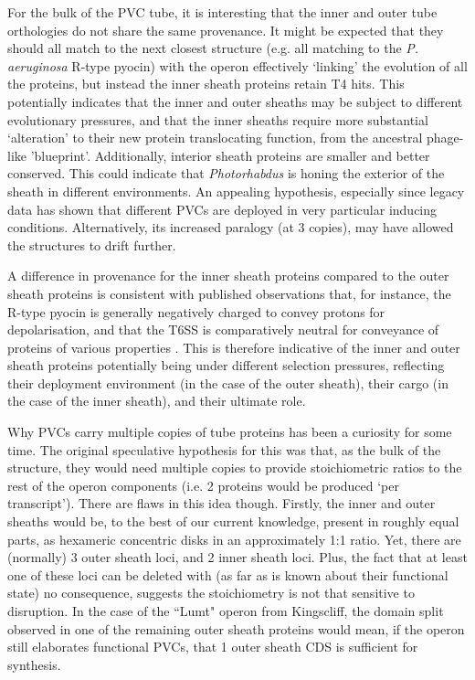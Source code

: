 For the bulk of the PVC tube, it is interesting that the inner and outer tube orthologies do not share the same provenance. It might be expected that they should all match to the next closest structure (e.g. all matching to the \emph{P. aeruginosa} R-type pyocin) with the operon effectively `linking' the evolution of all the proteins, but instead the inner sheath proteins retain T4 hits. This potentially indicates that the inner and outer sheaths may be subject to different evolutionary pressures, and that the inner sheaths require more substantial `alteration' to their new protein translocating function, from the ancestral phage-like 'blueprint'. Additionally, interior sheath proteins are smaller and better conserved. This could indicate that \emph{Photorhabdus} is honing the exterior of the sheath in different environments. An appealing hypothesis, especially since legacy data has shown that different PVCs are deployed in very particular inducing conditions. Alternatively, its increased paralogy (at 3 copies), may have allowed the structures to drift further.

A difference in provenance for the inner sheath proteins compared to the outer sheath proteins is consistent with published observations that, for instance, the R-type pyocin is generally negatively charged to convey protons for depolarisation, and that the T6SS is comparatively neutral for conveyance of proteins of various properties \citep{Ge2015}. This is therefore indicative of the inner and outer sheath proteins potentially being under different selection pressures, reflecting their deployment environment (in the case of the outer sheath), their cargo (in the case of the inner sheath), and their ultimate role.

Why PVCs carry multiple copies of tube proteins has been a curiosity for some time. The original speculative hypothesis for this was that, as the bulk of the structure, they would need multiple copies to provide stoichiometric ratios to the rest of the operon components (i.e. 2 proteins would be produced `per transcript'). There are flaws in this idea though. Firstly, the inner and outer sheaths would be, to the best of our current knowledge, present in roughly equal parts, as hexameric concentric disks in an approximately 1:1 ratio. Yet, there are (normally) 3 outer sheath loci, and 2 inner sheath loci. Plus, the fact that at least one of these loci can be deleted with (as far as is known about their functional state) no consequence, suggests the stoichiometry is not that sensitive to disruption. In the case of the ``Lumt" operon from \Pasy{} Kingscliff, the domain split observed in one of the remaining outer sheath proteins would mean, if the operon still elaborates functional PVCs, that 1 outer sheath CDS is sufficient for synthesis.

